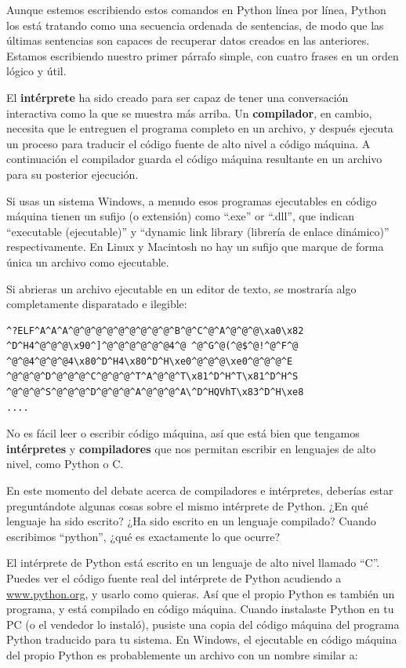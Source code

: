Aunque estemos escribiendo estos comandos en Python línea por línea, Python
los está tratando como una secuencia ordenada de sentencias, de modo
que las últimas sentencias son capaces de recuperar datos creados en las
anteriores. Estamos escribiendo nuestro primer párrafo simple, con cuatro frases
en un orden lógico y útil.

El {\bf intérprete} ha sido creado para ser capaz de tener una conversación interactiva como la que se muestra más arriba.
Un {\bf compilador}, en cambio, necesita que le entreguen el programa
completo en un archivo, y después
ejecuta un proceso para traducir el código fuente de alto nivel a código máquina.
A continuación el compilador guarda el código máquina resultante en un archivo para su
posterior ejecución. 

Si usas un sistema Windows, a menudo esos programas ejecutables en código máquina
tienen un sufijo (o extensión) como ``.exe'' or ``.dll'', que indican ``executable (ejecutable)'' y ``dynamic
link library (librería de enlace dinámico)'' respectivamente. En Linux y Macintosh
no hay un sufijo que marque de forma única un archivo como ejecutable.

Si abrieras un archivo ejecutable en un editor de texto, se mostraría algo
completamente disparatado e ilegible:

\beforeverb
\begin{verbatim}
^?ELF^A^A^A^@^@^@^@^@^@^@^@^@^B^@^C^@^A^@^@^@\xa0\x82
^D^H4^@^@^@\x90^]^@^@^@^@^@^@4^@ ^@^G^@(^@$^@!^@^F^@
^@^@4^@^@^@4\x80^D^H4\x80^D^H\xe0^@^@^@\xe0^@^@^@^E
^@^@^@^D^@^@^@^C^@^@^@^T^A^@^@^T\x81^D^H^T\x81^D^H^S
^@^@^@^S^@^@^@^D^@^@^@^A^@^@^@^A\^D^HQVhT\x83^D^H\xe8
....
\end{verbatim}
\afterverb
%
No es fácil leer o escribir código máquina, así que está bien que tengamos
{\bf intérpretes} y {\bf compiladores} que nos permitan escribir en lenguajes
de alto nivel, como Python o C.

En este momento del debate acerca de compiladores e intérpretes, deberías
estar preguntándote algunas cosas sobre el mismo intérprete de Python. ¿En qué
lenguaje ha sido escrito? ¿Ha sido escrito en un lenguaje compilado? Cuando escribimos ``python'', ¿qué es exactamente lo que ocurre?

El intérprete de Python está escrito en un lenguaje de alto nivel llamado ``C''.
Puedes ver el código fuente real del intérprete de Python acudiendo a
\url{www.python.org}, y usarlo como quieras.
Así que el propio Python es también un programa, y está compilado en código máquina.
Cuando instalaste Python en tu PC (o el vendedor lo instaló),
pusiste una copia del código máquina del programa Python traducido para tu sistema.
En Windows, el ejecutable en código máquina del propio Python es probablemente
un archivo con un nombre similar a:

